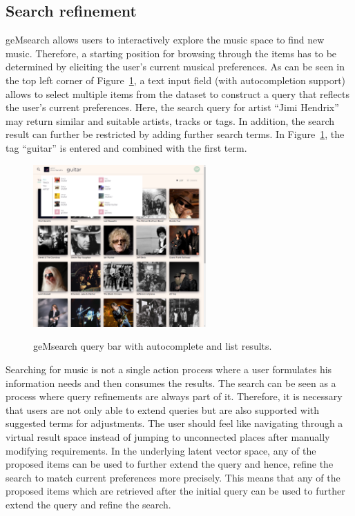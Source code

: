 \documentclass[sigconf]{acmart}
\begin{document}
\subsection{Search refinement}
\label{sec:refinement}
geMsearch allows users to interactively explore the music space to find new music. Therefore, a starting position for browsing through the items has to be determined by eliciting the user's current musical preferences. As can be seen in the top left corner of Figure~\ref{fig:web_client_query}, a text input field (with autocompletion support) allows to select multiple items from the dataset to construct a query that reflects the user's current preferences. Here, the search query for artist ``Jimi Hendrix'' may return similar and suitable artists, tracks or tags. In addition, the search result can further be restricted by adding further search terms. In Figure~\ref{fig:web_client_query}, the tag ``guitar'' is entered and combined with the first term. \\

\begin{figure}[ht]
	{\includegraphics[width=250px]{images/search-autocomplete.png}}	
	\caption{geMsearch query bar with autocomplete and list results.}
	\label{fig:web_client_query}
\end{figure}

Searching for music is not a single action process where a user formulates his information needs and then consumes the results. The search can be seen as a process where query refinements are always part of it. Therefore, it is necessary that users are not only able to extend queries but are also supported with suggested terms for adjustments. The user should feel like navigating through a virtual result space instead of jumping to unconnected places after manually modifying requirements. In the underlying latent vector space, any of the proposed items can be used to further extend the query and hence, refine the search to match current preferences more precisely. This means that any of the proposed items which are retrieved after the initial query can be used to further extend the query and refine the search.
\end{document}
